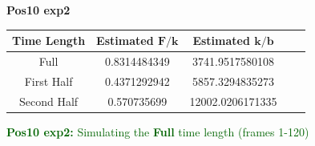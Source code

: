 \documentclass[12pt]{article}
\begin{document}
\vspace*{1in}
{\LARGE \textbf{Pos10 exp2}}
\vspace{.5in}
\begin{table}[h!]
    \begin{center}
    \Large
	\renewcommand{\arraystretch}{1.3}
        \begin{tabular}{|c|c|c|c|c|}
            \hline
		\textbf{Time Length} & \textbf{Estimated} $\boldsymbol F/\boldsymbol k$ & \textbf{Estimated} $\boldsymbol k/\boldsymbol b$ \\ \hline
		Full & 0.8314484349 & 3741.9517580108 \\ \hline
		First Half & 0.4371292942 & 5857.3294835273 \\ \hline
		Second Half & 0.570735699 & 12002.0206171335 \\ \hline
        \end{tabular}
     \end{center}
\end{table}

\clearpage

\noindent \textcolor{DarkGreen}{\textbf{Pos10 exp2:} Simulating the \textbf{Full} time length (frames 1-120)}
\end{document}
